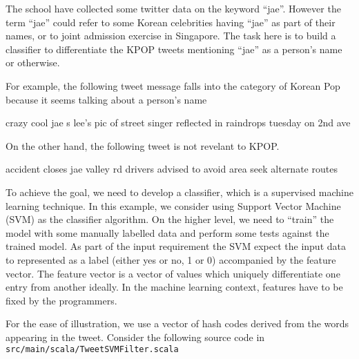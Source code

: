 \documentclass[10pt]{article}
\begin{document}
The school have collected some twitter data on the keyword ``jae''. 
However the term ``jae'' could refer to some 
Korean celebrities having ``jae'' as part of their names, or to joint
admission exercise in Singapore. 
The task here is to build a classifier to differentiate the KPOP tweets
mentioning ``jae'' as a person's name or otherwise.

For example, the following tweet message falls into the category of
Korean Pop because it seems talking about a person's name 
\begin{code}
crazy cool   jae s lee's pic of street singer reflected in raindrops
 tuesday on 2nd ave  
\end{code}
%
On the other hand, the following tweet is not revelant to KPOP. 
\begin{code}
accident closes jae valley rd drivers advised to avoid area seek 
alternate routes
\end{code}
%
To achieve the goal, we need to develop a classifier, which is a
supervised machine learning technique. In this example, we consider
using Support Vector Machine (SVM) as the classifier
algorithm. On the higher level, we need to ``train'' the model with
some manually labelled data and perform some tests against the trained
model. As part of the input requirement the SVM expect the input data
to represented as a label (either yes or no, 1 or 0) accompanied by
the feature vector. The feature vector is a vector of values which
uniquely differentiate one entry from another ideally.  In the machine
learning context, features have to be fixed by the programmers. 

For the ease of illustration, we use a vector of hash codes derived
from the words appearing in the tweet.  Consider the following source
code in {\tt src/main/scala/TweetSVMFilter.scala} 
\end{document}
